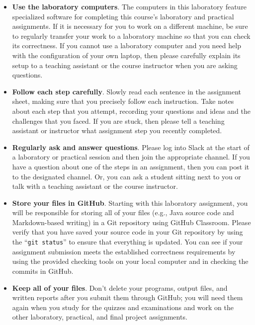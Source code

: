 \documentclass[11pt]{article}
\begin{document}
\begin{itemize}
  \setlength{\itemsep}{0pt}

\item {\bf Use the laboratory computers}. The computers in this laboratory feature specialized software for completing
  this course's laboratory and practical assignments. If it is necessary for you to work on a different machine, be sure
  to regularly transfer your work to a laboratory machine so that you can check its correctness. If you cannot use a
  laboratory computer and you need help with the configuration of your own laptop, then please carefully explain its
  setup to a teaching assistant or the course instructor when you are asking questions.

\item {\bf Follow each step carefully}. Slowly read each sentence in the assignment sheet, making sure that you
  precisely follow each instruction. Take notes about each step that you attempt, recording your questions and ideas and
  the challenges that you faced. If you are stuck, then please tell a teaching assistant or instructor what assignment
  step you recently completed.

\item {\bf Regularly ask and answer questions}. Please log into Slack at the start of a laboratory or practical session
  and then join the appropriate channel. If you have a question about one of the steps in an assignment, then you can
  post it to the designated channel. Or, you can ask a student sitting next to you or talk with a teaching assistant or
  the course instructor.

\item {\bf Store your files in GitHub}. Starting with this laboratory assignment, you will be responsible for storing
  all of your files (e.g., Java source code and Markdown-based writing) in a Git repository using GitHub Classroom.
  Please verify that you have saved your source code in your Git repository by using the ``{\tt git status}'' to ensure
  that everything is updated. You can see if your assignment submission meets the established correctness requirements
  by using the provided checking tools on your local computer and in checking the commits in GitHub.

\item {\bf Keep all of your files}. Don't delete your programs, output files, and written reports after you submit them
  through GitHub; you will need them again when you study for the quizzes and examinations and work on the other
  laboratory, practical, and final project assignments.


\end{itemize}
\end{document}
